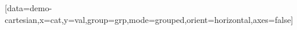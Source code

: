 \documentclass{article}
\begin{document}
\SemioVizProbeOn
{}
\begin{VizProbeCanvas}[80][40]
[data=demo-cartesian,x=cat,y=val,group=grp,mode=grouped,orient=horizontal,axes=false]
\end{VizProbeCanvas}
\end{document}
